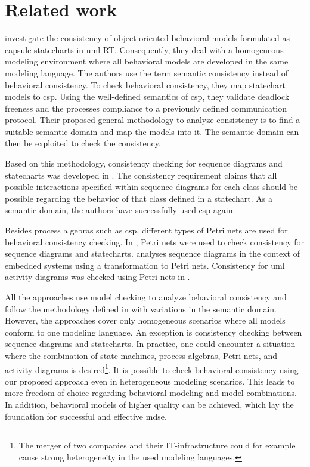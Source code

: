 \documentclass[conference]{IEEEtran}
\begin{document}
\section{Related work}
\cite{engelsMethodologySpecifyingAnalyzing2001} investigate the consistency of object-oriented behavioral models formulated as capsule statecharts in \gls{uml}-RT.
Consequently, they deal with a homogeneous modeling environment where all behavioral models are developed in the same modeling language.
The authors use the term semantic consistency instead of behavioral consistency.
To check behavioral consistency, they map statechart models to \gls{csp}.
Using the well-defined semantics of \gls{csp}, they validate deadlock freeness and the processes compliance to a previously defined communication protocol.
Their proposed general methodology to analyze consistency is to find a suitable semantic domain and map the models into it.
The semantic domain can then be exploited to check the consistency.

Based on this methodology, consistency checking for sequence diagrams and statecharts was developed in \cite{kusterExplicitBehavioralConsistency2003}.
The consistency requirement claims that all possible interactions specified within sequence diagrams for each class should be possible regarding the behavior of that class defined in a statechart.
As a semantic domain, the authors have successfully used \gls{csp} again.

Besides process algebras such as \gls{csp}, different types of Petri nets are used for behavioral consistency checking.
In \cite{yaoConsistencyCheckingUML2006}, Petri nets were used to check consistency for sequence diagrams and statecharts.
\cite{cunhaFormalVerificationUML2011} analyses sequence diagrams in the context of embedded systems using a transformation to Petri nets.
Consistency for \gls{uml} activity diagrams was checked using Petri nets in \cite{thierry-miegUMLBehavioralConsistency2008}.

All the approaches use model checking to analyze behavioral consistency and follow the methodology defined in \cite{engelsMethodologySpecifyingAnalyzing2001} with variations in the semantic domain.
However, the approaches cover only homogeneous scenarios where all models conform to one modeling language.
An exception is consistency checking between sequence diagrams and statecharts.
In practice, one could encounter a situation where the combination of state machines, process algebras, Petri nets, and activity diagrams is desired\footnote{The merger of two companies and their IT-infrastructure could for example cause strong heterogeneity in the used modeling languages.}.
It is possible to check behavioral consistency using our proposed approach even in heterogeneous modeling scenarios.
This leads to more freedom of choice regarding behavioral modeling and model combinations.
In addition, behavioral models of higher quality can be achieved, which lay the foundation for successful and effective \gls{mdse}.
\end{document}
